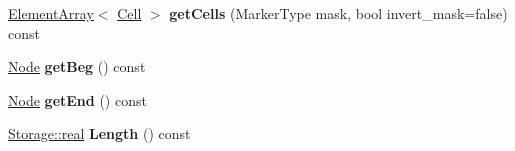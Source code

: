 \begin{DoxyCompactItemize}
\item 
\hypertarget{classINMOST_1_1Edge_adc1db1a972137a0a1afe4bd607c54944}{\hyperlink{classINMOST_1_1ElementArray}{Element\-Array}$<$ \hyperlink{classINMOST_1_1Cell}{Cell} $>$ {\bfseries get\-Cells} (Marker\-Type mask, bool invert\-\_\-mask=false) const }\label{classINMOST_1_1Edge_adc1db1a972137a0a1afe4bd607c54944}

\item 
\hypertarget{classINMOST_1_1Edge_ad4a038ca78494621360e316c7eb4d2f7}{\hyperlink{classINMOST_1_1Node}{Node} {\bfseries get\-Beg} () const }\label{classINMOST_1_1Edge_ad4a038ca78494621360e316c7eb4d2f7}

\item 
\hypertarget{classINMOST_1_1Edge_a70191d91caf80e248728814c65f32573}{\hyperlink{classINMOST_1_1Node}{Node} {\bfseries get\-End} () const }\label{classINMOST_1_1Edge_a70191d91caf80e248728814c65f32573}

\item 
\hypertarget{classINMOST_1_1Edge_a5fe21d1ca8c154a833b87cd8ee257b42}{\hyperlink{classINMOST_1_1Storage_a853346784b4a5822a7fac54d8f10f805}{Storage\-::real} {\bfseries Length} () const }\label{classINMOST_1_1Edge_a5fe21d1ca8c154a833b87cd8ee257b42}

\end{DoxyCompactItemize}
